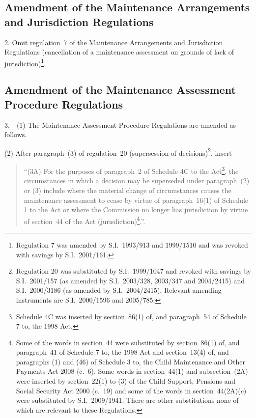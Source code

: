\documentclass[12pt,a4paper]{article}
\begin{document}
\subsection[2. Amendment of the Maintenance Arrangements and Jurisdiction Regulations]{Amendment of the Maintenance Arrangements and Jurisdiction Regulations}

2.  Omit regulation~7 of the Maintenance Arrangements and Jurisdiction Regulations (cancellation of a maintenance assessment on grounds of lack of jurisdiction)\footnote{Regulation 7 was amended by S.I.~1993/913 and 1999/1510 and was revoked with savings by S.I.~2001/161.}.

\subsection[3. Amendment of the Maintenance Assessment Procedure Regulations]{Amendment of the Maintenance Assessment Procedure Regulations}

3.---(1)  The Maintenance Assessment Procedure Regulations are amended as follows.

(2) After paragraph~(3) of regulation~20 (supersession of decisions)\footnote{Regulation 20 was substituted by S.I.~1999/1047 and revoked with savings by S.I.~2001/157 (as amended by S.I.~2003/328, 2003/347 and 2004/2415) and S.I.~2000/3186 (as amended by S.I.~2004/2415). Relevant amending instruments are S.I.~2000/1596 and 2005/785.}, insert—
\begin{quotation}
“(3A) For the purposes of paragraph~2 of Schedule 4C to the Act\footnote{Schedule 4C was inserted by section~86(1) of, and paragraph~54 of Schedule 7 to, the 1998 Act.}, the circumstances in which a decision may be superseded under paragraph~(2) or (3) include where the material change of circumstances causes the maintenance assessment to cease by virtue of paragraph~16(1) of Schedule 1 to the Act or where the Commission no longer has jurisdiction by virtue of section~44 of the Act (jurisdiction)\footnote{Some of the words in section~44 were substituted by section~86(1) of, and paragraph~41 of Schedule 7 to, the 1998 Act and section~13(4) of, and paragraphs (1) and (46) of Schedule 3 to, the Child Maintenance and Other Payments Act 2008 (c.~6). Some words in section~44(1) and subsection~(2A) were inserted by section~22(1) to (3) of the Child Support, Pensions and Social Security Act 2000 (c.~19) and some of the words in section~44(2A)($c$)  were substituted by S.I.~2009/1941. There are other substitutions none of which are relevant to these Regulations.}.”.
\end{quotation}
\end{document}
